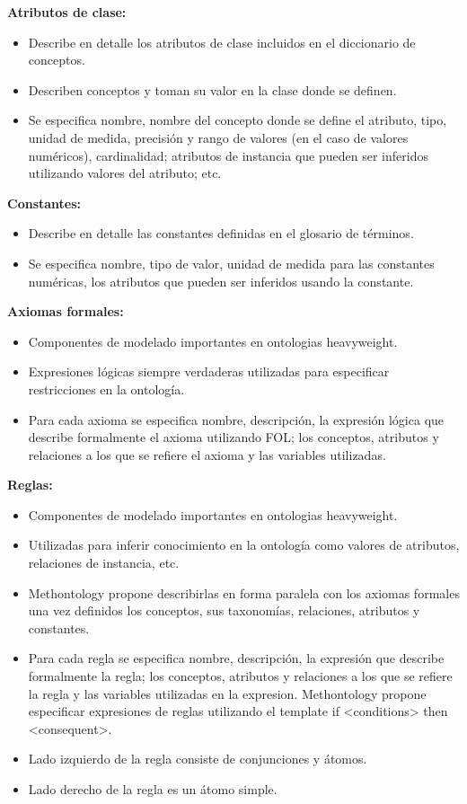 \documentclass[a4paper,10pt,spanish,oneside]{article}
\begin{document}
\textbf{Atributos de clase:}

\begin{itemize}
\item Describe en detalle los atributos de clase incluidos en el diccionario de conceptos.
\item Describen conceptos y toman su valor en la clase donde se definen.
\item Se especifica nombre, nombre del concepto donde se define el atributo, tipo, unidad de medida, precisión y rango de valores (en el caso de valores numéricos), cardinalidad; atributos de instancia que pueden ser inferidos utilizando valores del atributo; etc.
\end{itemize}

\textbf{Constantes:}

\begin{itemize}
\item Describe en detalle las constantes definidas en el glosario
de términos.
\item Se especifica nombre, tipo de valor, unidad de medida para las constantes numéricas, los atributos que pueden ser inferidos usando la constante.
\end{itemize}

\textbf{Axiomas formales:}

\begin{itemize}
\item Componentes de modelado importantes en ontologias heavyweight.
\item Expresiones lógicas siempre verdaderas utilizadas para especificar restricciones en la ontología.
\item Para cada axioma se especifica nombre, descripción, la expresión lógica que describe formalmente el axioma utilizando FOL; los conceptos, atributos y relaciones a los que se refiere el axioma y las variables utilizadas.
\end{itemize}

\textbf{Reglas:}

\begin{itemize}
\item Componentes de modelado importantes en ontologias heavyweight.
\item Utilizadas para inferir conocimiento en la ontología como valores de atributos,  relaciones de instancia, etc.
\item Methontology propone describirlas en forma paralela con los axiomas formales una vez definidos los conceptos, sus taxonomías, relaciones, atributos y constantes.
\item Para cada regla se especifica nombre, descripción, la expresión que describe formalmente la regla; los conceptos, atributos y relaciones a los que se refiere la regla y las variables utilizadas en la expresion. Methontology propone especificar expresiones de reglas utilizando el template if <conditions> then <consequent>.
\item Lado izquierdo de la regla consiste de conjunciones y átomos.
\item Lado derecho de la regla es un átomo simple.
\end{itemize}
\end{document}
